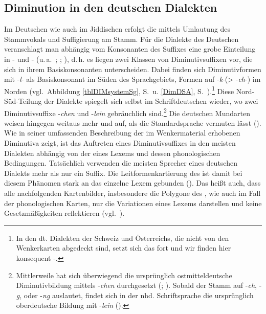 \subsection{Diminution in den deutschen Dialekten}\label{dimDEUTSCH}
Im Deutschen wie auch im Jiddischen erfolgt die  mittels Umlautung des Stammvokals und Suffigierung am Stamm. Für die Dialekte des Deutschen veranschlagt man abhängig vom Konsonanten des Suffixes eine grobe Einteilung in - und - (u.\,a.\, \citealt{Wrede1908}; \citealt[475–487]{Schirmunski1962}; \citealt{Seebold1983}), d.\,h. es liegen zwei Klassen von Diminutivsuffixen vor, die sich in ihrem Basiskonsonanten unterscheiden. Dabei finden sich Diminutivformen mit -\textit{l}- als Basiskonsonant im Süden des Sprachgebiets, Formen auf -\textit{k}-(> -\textit{ch}-) im Norden (vgl.\, Abbildung \ref{tblDIMsystemSg}, S.\, \pageref{tblDIMsystemSg} u. \ref{DimDSA}, S.\, \pageref{DimDSA}).\footnote{In den dt. Dialekten der Schweiz und Österreichs, die nicht von den Wenkerkarten abgedeckt sind, setzt sich das  fort und wir finden hier konsequent -.} Diese Nord-Süd-Teilung der Dialekte spiegelt sich selbst im Schriftdeutschen wieder, wo zwei Diminutivsuffixe -\textit{chen} und -\textit{lein} gebräuchlich sind.\footnote{Mittlerweile hat sich überwiegend die ursprünglich ostmitteldeutsche Diminutivbildung mittels -\textit{chen} durchgesetzt (\citealt[475, 479]{Schirmunski1962}; \citealt[157]{Koenig1978}). Sobald der Stamm auf -\textit{ch}, -\textit{g}, oder -\textit{ng} auslautet, findet sich in der nhd. Schriftsprache die ursprünglich oberdeutsche Bildung mit -\textit{lein} (\citealt[475]{Schirmunski1962}).} Die deutschen Mundarten weisen hingegen weitaus mehr und  auf, als die Standardsprache vermuten lässt (\citealt[476]{Schirmunski1962}). Wie \cite{Wrede1908} in seiner umfassenden Beschreibung der im Wenkermaterial erhobenen Diminutiva zeigt, ist das Auftreten eines Diminutivsuffixes in den meisten Dialekten abhängig von der  eines Lexems und dessen phonologischen Bedingungen. Tatsächlich verwenden die meisten Sprecher eines deutschen Dialekts mehr als nur ein Suffix. Die Leitformenkartierung des  ist damit bei diesem Phänomen stark an das einzelne Lexem gebunden (\citealt[74f]{Wrede1908}).\label{wredeDIM} Das heißt auch, dass alle nachfolgenden Kartenbilder, insbesondere die Polygone des , wie auch im Fall der phonologischen Karten, nur die Variationen eines Lexems darstellen und keine Gesetzmäßigkeiten reflektieren (vgl.\, \citealt[79]{Wrede1908}). 
   
